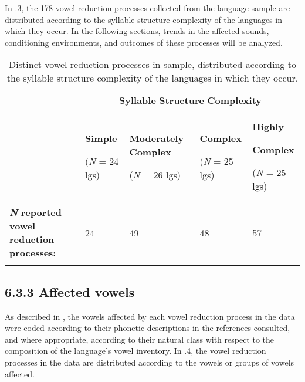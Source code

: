   In .3, the 178 vowel reduction processes collected from the language sample are distributed according to the syllable structure complexity of the languages in which they occur. In the following sections, trends in the affected sounds, conditioning environments, and outcomes of these processes will be analyzed.






\begin{table}
\begin{tabularx}{\textwidth}{XXXXX}
\lsptoprule
 & \multicolumn{4}{c}{ \textbf{Syllable} \textbf{Structure} \textbf{Complexity}}\\
& { \textbf{Simple}}

 (\textit{N} = 24 lgs) & { \textbf{Moderately} \textbf{Complex}}

 (\textit{N} = 26 lgs) & { \textbf{Complex}}

 (\textit{N} = 25 lgs) & { \textbf{Highly} }

{ \textbf{Complex}}

 (\textit{N} = 25 lgs)\\
 \textbf{\textit{N}} \textbf{reported} \textbf{vowel} \textbf{reduction} \textbf{processes:} & 24 & 49 & 48 & 57\\
\lspbottomrule
\end{tabularx}
\caption{\label{6.3}Distinct vowel reduction processes in sample, distributed according to the syllable structure complexity of the languages in which they occur.}
\end{table}



\subsection{6.3.3 Affected vowels}

  As described in , the vowels affected by each vowel reduction process in the data were coded according to their phonetic descriptions in the references consulted, and where appropriate, according to their natural class with respect to the composition of the language’s vowel inventory. In .4, the vowel reduction processes in the data are distributed according to the vowels or groups of vowels affected.






